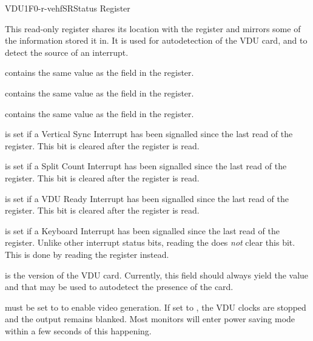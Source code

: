 \begin{ioport}{VDU}{1F0}{-r-vehf}{SR}{Status Register}

  This read-only register shares its location with the  register and
  mirrors some of the information stored it in. It is used for autodetection of
  the VDU card, and to detect the source of an interrupt.

  \begin{cbitfield}
  \end{cbitfield}

  \begin{description}
     contains the same value as the  field in the  register.

     contains the same value as the  field in the  register.

     contains the same value as the  field in the  register.

     is set if a Vertical Sync Interrupt has been signalled
    since the last read of the  register. This bit is cleared after the register is read.

     is set if a Split Count Interrupt has been signalled
    since the last read of the  register. This bit is cleared after the register is read.

     is set if a VDU Ready Interrupt has been signalled
    since the last read of the  register. This bit is cleared after the register is read.

     is set if a Keyboard Interrupt has been signalled since
    the last read of the  register. Unlike other interrupt status
    bits, reading the  does {\em not\/} clear this bit. This is done
    by reading the  register instead.

     is the version of the VDU card. Currently, this
    field should always yield the value  and that may be used to
    autodetect the presence of the card.

     must be set to  to enable video generation. If set
    to , the VDU clocks are stopped and the output remains blanked. Most
    monitors will enter power saving mode within a few seconds of this
    happening.
  \end{description}

\end{ioport}







